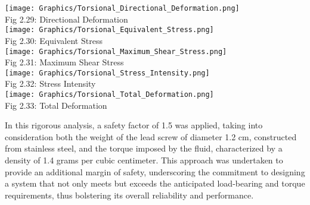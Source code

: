 \documentclass[a4,10pt]{report}
\begin{document}
\begin{enumerate}
\begin{center}
     \texttt{[image: Graphics/Torsional\_Directional\_Deformation.png]} \\
     \normalsize{Fig 2.29: Directional Deformation} \\
     \vspace{10mm}
     \texttt{[image: Graphics/Torsional\_Equivalent\_Stress.png]} \\
     \normalsize{Fig 2.30: Equivalent Stress} \\
     \vspace{10mm}
     \texttt{[image: Graphics/Torsional\_Maximum\_Shear\_Stress.png]} \\
     \normalsize{Fig 2.31: Maximum Shear Stress} \\
     \vspace{10mm}
     \texttt{[image: Graphics/Torsional\_Stress\_Intensity.png]} \\
     \normalsize{Fig 2.32: Stress Intensity} \\
     \vspace{10mm}
     \texttt{[image: Graphics/Torsional\_Total\_Deformation.png]} \\
     \normalsize{Fig 2.33: Total Deformation} \\
\end{center}
 \par In this rigorous analysis, a safety factor of 1.5 was applied, taking into consideration both the weight of the lead screw of diameter 1.2 cm, constructed from stainless steel, and the torque imposed by the fluid, characterized by a density of 1.4 grams per cubic centimeter. This approach was undertaken to provide an additional margin of safety, underscoring the commitment to designing a system that not only meets but exceeds the anticipated load-bearing and torque requirements, thus bolstering its overall reliability and performance.




\end{enumerate}
\end{document}
